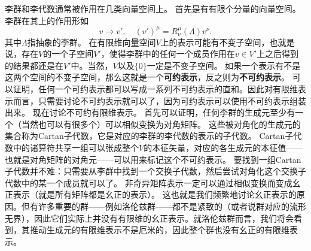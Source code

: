 \documentclass[hyperref, UTF8, a4paper]{ctexart}
\begin{document}
李群和李代数通常被作用在几类向量空间上。
首先是有有限个分量的向量空间。李群在其上的作用形如
\[
    v \longrightarrow v', \quad (v')^\mu = R_{\nu}^\mu (\Lambda) v^\nu.
\]
其中$\Lambda$指抽象的李群。
在有限维向量空间$V$上的表示可能有不变子空间，也就是说，存在$V$的一个子空间$V'$，使得李群中的任何一个成员作用在$v \in V'$上之后得到的结果都还是在$V'$中。当然，$V$以及$\{0\}$一定是不变子空间。
如果一个表示有不是这两个空间的不变子空间，那么这就是一个\textbf{可约表示}，反之则为\textbf{不可约表示}。
可以证明，任何一个可约表示都可以写成一系列不可约表示的直和。因此对有限维表示而言，只需要讨论不可约表示就可以了，因为可约表示可以使用不可约表示组装出来。
现在讨论不可约有限维表示。
首先可以证明，任何李群的生成元至少有一个（当然也可以有很多个）可以相似变换为对角矩阵。
这些被对角化的生成元的集合称为Cartan子代数，它是对应的李群的李代数的表示的子代数。
Cartan子代数中的诸算符共享一组可以张成整个$V$的本征矢量，对应的各生成元的本征值——也就是对角矩阵的对角元——可以用来标记这个不可约表示。
要找到一组Cartan子代数并不难：只需要从李群中找到一个交换子代数，然后尝试对角化这个交换子代数中的某一个成员就可以了。
非奇异矩阵表示一定可以通过相似变换而变成幺正表示（就是所有矩阵都是幺正的表示）。
这也就是我们频繁地讨论幺正表示的原因。但有许多重要的群——例如洛伦兹群——都不是紧致的（或者说群对应的流形无界），因此它们实际上并没有有限维的幺正表示。就洛伦兹群而言，我们将会看到，其推动生成元的有限维表示不是厄米的，因此整个群也没有幺正的有限维表示。
\end{document}
